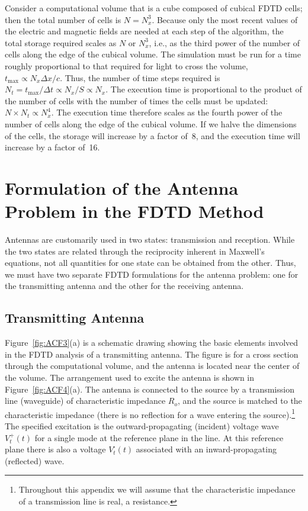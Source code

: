 Consider a computational volume that is a cube composed of cubical FDTD cells; then the total number of cells is $N=N^3_x$.  Because only the most recent values of the electric and magnetic fields are needed at each step of the algorithm, the total storage required scales as $N$ or $N^3_x$, i.e., as the third power of the number of cells along the edge of the cubical volume.  The simulation must be run for a time roughly proportional to that required for light to cross the volume, $t_\text{max} \propto N_x \Delta x / c$.  Thus, the number of time steps required is $N_t = t_\text{max} / \Delta t \propto N_x / S \propto N_x$.  The execution time is proportional to the product of the number of cells with the number of times the cells must be updated: $N \times N_t \propto N^4_x$.  The execution time therefore scales as the fourth power of the number of cells along the edge of the cubical volume.  If we halve the dimensions of the cells, the storage will increase by a factor of~8, and the execution time will increase by a factor of~16.

\section{Formulation of the Antenna Problem in the FDTD Method}

Antennas are customarily used in two states: transmission and reception.  While the two states are related through the reciprocity inherent in Maxwell's equations, not all quantities for one state can be obtained from the other.  Thus, we must have two separate FDTD formulations for the antenna problem: one for the transmitting antenna and the other for the receiving antenna.

\subsection{Transmitting Antenna}

Figure~\ref{fig:ACF3}(a) is a schematic drawing showing the basic elements involved in the FDTD analysis of a transmitting antenna.  The figure is for a cross section through the computational volume, and the antenna is located near the center of the volume.  The arrangement used to excite the antenna is shown in Figure~\ref{fig:ACF4}(a).  The antenna is connected to the source by a transmission line (waveguide) of characteristic impedance $R_o$, and the source is matched to the characteristic impedance (there is no reflection for a wave entering the source).\footnote{Throughout this appendix we will assume that the characteristic impedance of a transmission line is real, a resistance.}  The specified excitation is the outward-propagating (incident) voltage wave $V^\text{+}_t(t)$ for a single mode at the reference plane in the line.  At this reference plane there is also a voltage $V^\text{-}_t(t)$ associated with an inward-propagating (reflected) wave.

